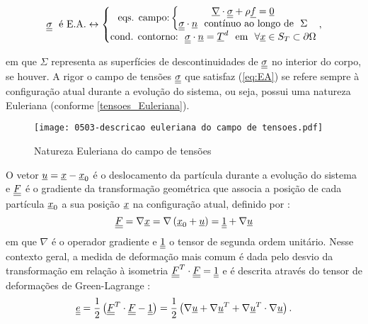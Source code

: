 \begin{equation}
	\label{eq:EA}
	\underline{\underline \sigma}~~ \text{é E.A.} \leftrightarrow \left\{
		\begin{matrix}
			\text{eqs. campo:} \left\{
				\begin{matrix}
					\underline \nabla \cdot \underline{\underline \sigma}+ \rho \underline f = \underline 0 \\ 
					\underline{\underline \sigma} \cdot \underline n ~~ \text{contínuo ao longo de} ~~ \Sigma
		
				\end{matrix}\right. \\ 
			\text{cond. contorno:}~~ \underline{\underline \sigma} \cdot \underline n = \underline T^d ~~ \text{em} ~~ \forall \underline x \in S_T \subset \partial \Omega
		\end{matrix}\right.,
\end{equation}

em que $\Sigma$  representa as superfícies de descontinuidades de $\underline{\underline \sigma}$ no interior do corpo, se houver. A rigor o campo de tensões $\underline{\underline \sigma}$ que satisfaz (\ref{eq:EA}) se refere sempre à configuração atual durante a evolução do sistema, ou seja, possui uma natureza Euleriana (conforme \autoref{tensoes_Euleriana}).

\begin{figure}[H]
	\begin{center}
		\texttt{[image: 0503-descricao euleriana do campo de tensoes.pdf]}
	\end{center}
	\caption{\label{tensoes_Euleriana}Natureza Euleriana do campo de tensões}
\end{figure}

O vetor $\underline u = \underline x - \underline x_0$ é o deslocamento da partícula durante a evolução do sistema e $\underline{\underline F}$ é o gradiente da transformação geométrica que associa a posição de cada partícula $\underline x_0$ a sua posição $\underline x$ na configuração atual, definido por \cite[p. 55]{Salencon2001}:
\begin{equation}
	\label{eq:transformacao_geometrica}
 	\underline{\underline F} = \nabla \underline x = \nabla \left( \underline x_0+\underline u \right) = \underline{\underline 1} + \nabla \underline u
\end{equation}
em que $\nabla$ é o operador gradiente e $\underline{\underline 1}$ o tensor de segunda ordem unitário. Nesse contexto geral, a medida de deformação mais comum é dada pelo desvio da transformação em relação à isometria $\underline{\underline F}^T \cdot \underline{\underline F} = \underline{\underline 1}$ e é descrita através do tensor de deformações de Green-Lagrange \cite[p. 55]{Salencon2001}:
\begin{equation}
	\label{eq:green_lagrange}
	\underline{\underline e} = \frac{1}{2} \left(\underline{\underline F}^T \cdot \underline{\underline F} - \underline{\underline 1} \right) = \frac{1}{2} \left(\nabla \underline u + \nabla\underline u^T + \nabla\underline u^T \cdot \nabla \underline u \right).
\end{equation}

